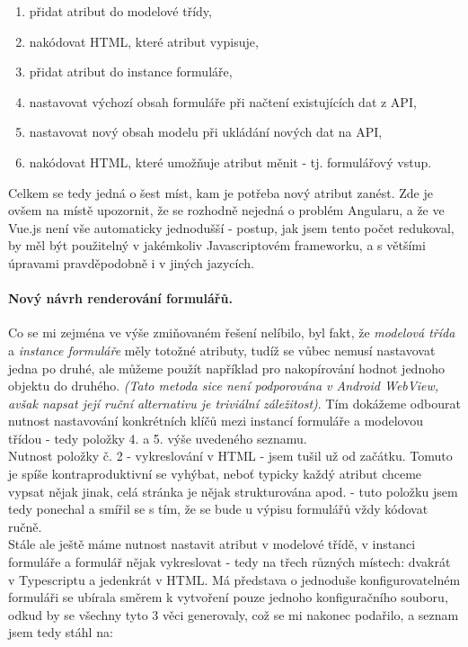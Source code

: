 \begin{enumerate}
    \item přidat atribut do modelové třídy,
    \item nakódovat HTML, které atribut vypisuje,
    \item přidat atribut do instance formuláře,
    \item nastavovat výchozí obsah formuláře při načtení existujících dat z API,
    \item nastavovat nový obsah modelu při ukládání nových dat na API,
    \item nakódovat HTML, které umožňuje atribut měnit - tj. formulářový vstup.
\end{enumerate}

Celkem se tedy jedná o šest míst, kam je potřeba nový atribut zanést. Zde je ovšem na místě upozornit, že se rozhodně nejedná o problém Angularu, a že ve Vue.js není vše automaticky jednodušší - postup, jak jsem tento počet redukoval, by měl být použitelný v jakémkoliv Javascriptovém frameworku, a s většími úpravami pravděpodobně i v jiných jazycích.\\

\paragraph{Nový návrh renderování formulářů.} Co se mi zejména ve výše zmiňovaném řešení nelíbilo, byl fakt, že \emph{modelová třída} a \emph{instance formuláře} měly totožné atributy, tudíž se vůbec nemusí nastavovat jedna po druhé, ale můžeme použít například  \cite{mdn-object-assign} pro nakopírování hodnot jednoho objektu do druhého. \emph{(Tato metoda sice není podporována v Android WebView, avšak napsat její ruční alternativu je triviální záležitost)}. Tím dokážeme odbourat nutnost nastavování konkrétních klíčů mezi instancí formuláře a modelovou třídou - tedy položky 4. a 5. výše uvedeného seznamu.\\
Nutnost položky č. 2 - vykreslování v HTML - jsem tušil už od začátku. Tomuto je spíše kontraproduktivní se vyhýbat, neboť typicky každý atribut chceme vypsat nějak jinak, celá stránka je nějak strukturována apod. - tuto položku jsem tedy ponechal a smířil se s tím, že se bude u výpisu formulářů vždy kódovat ručně.\\
Stále ale ještě máme nutnost nastavit atribut v modelové třídě, v instanci formuláře a formulář nějak vykreslovat - tedy na třech různých místech: dvakrát v Typescriptu a jedenkrát v HTML. Má představa o jednoduše konfigurovatelném formuláři se ubírala směrem k vytvoření pouze jednoho konfiguračního souboru, odkud by se všechny tyto 3 věci generovaly, což se mi nakonec podařilo, a seznam jsem tedy stáhl na:

